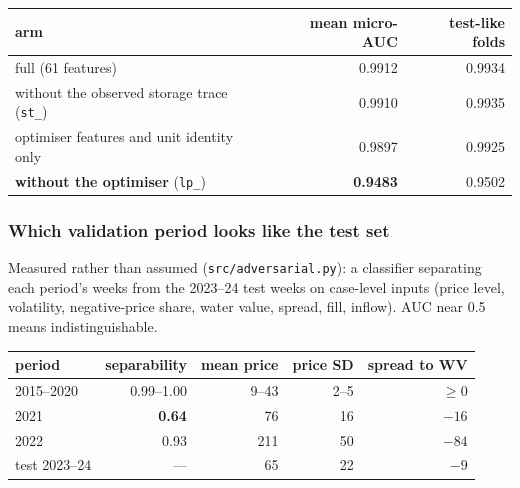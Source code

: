 \begin{center}\small
\begin{tabular}{lrr}
\toprule
arm & mean micro-AUC & test-like folds \\
\midrule
full (61 features) & 0.9912 & 0.9934 \\
without the observed storage trace (\texttt{st\_}) & 0.9910 & 0.9935 \\
optimiser features and unit identity only & 0.9897 & 0.9925 \\
\textbf{without the optimiser} (\texttt{lp\_}) & \textbf{0.9483} & 0.9502 \\
\bottomrule
\end{tabular}
\end{center}


\subsubsection*{Which validation period looks like the test set}

Measured rather than assumed (\texttt{src/adversarial.py}): a classifier separating each period's
weeks from the 2023--24 test weeks on case-level inputs (price level, volatility, negative-price
share, water value, spread, fill, inflow). AUC near 0.5 means indistinguishable.

\begin{center}\small
\begin{tabular}{lrrrr}
\toprule
period & separability & mean price & price SD & spread to WV \\
\midrule
2015--2020 & 0.99--1.00 & 9--43 & 2--5 & $\geq 0$ \\
2021 & \textbf{0.64} & 76 & 16 & $-16$ \\
2022 & 0.93 & 211 & 50 & $-84$ \\
test 2023--24 & --- & 65 & 22 & $-9$ \\
\bottomrule
\end{tabular}
\end{center}


